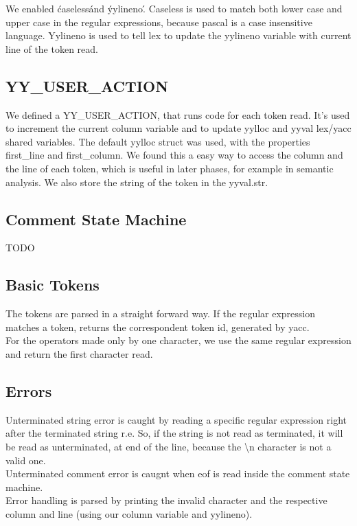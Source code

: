 \documentclass[12pt]{article}
\begin{document}
We enabled \'caseless\' and \'yylineno\'. Caseless is used to match both lower case and upper case in the regular expressions, because pascal is a case insensitive language. Yylineno is used to tell lex to update the yylineno variable with current line of the token read.

\subsection{YY\_USER\_ACTION}

We defined a YY\_USER\_ACTION, that runs code for each token read. It's used to increment the current column variable and to update yylloc and yyval lex/yacc shared variables. The default yylloc struct was used, with the properties first\_line and first\_column. We found this a easy way to access the column and the line of each token, which is useful in later phases, for example in semantic analysis. We also store the string of the token in the yyval.str.\\

\subsection{Comment State Machine}

TODO

\subsection{Basic Tokens}

The tokens are parsed in a straight forward way. If the regular expression matches a token, returns the correspondent token id, generated by yacc.\\ For the operators made only by one character, we use the same regular expression and return the first character read.\\

\subsection{Errors}

Unterminated string error is caught by reading a specific regular expression right after the terminated string r.e. So, if the string is not read as terminated, it will be read as unterminated, at end of the line, because the \textbackslash n character is not a valid one.\\
Unterminated comment error is caugnt when eof is read inside the comment state machine.\\
Error handling is parsed by printing the invalid character and the respective column and line (using our column variable and yylineno).\\
\end{document}
